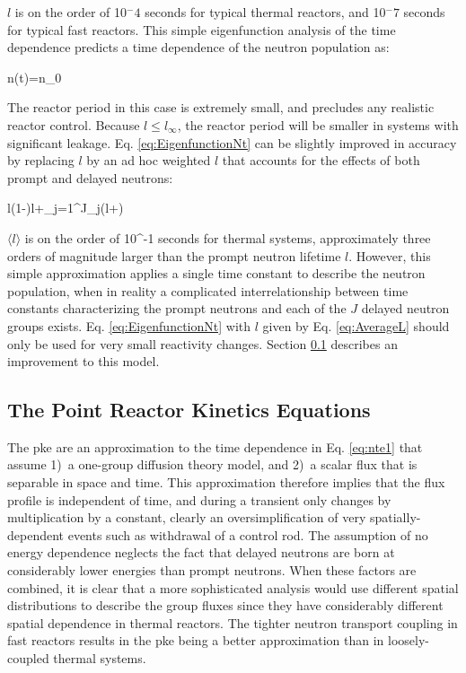 \(l\) is on the order of 10$^-4$ seconds for typical thermal reactors, and 10$^-7$ seconds for typical fast reactors. This simple eigenfunction analysis of the time dependence predicts a time dependence of the neutron population as:

\beq
\label{eq:EigenfunctionNt}
n(t)=n_0
\eeq

The reactor period in this case is extremely small, and precludes any realistic reactor control. Because \(l\leq l_\infty\), the reactor period will be smaller in systems with significant leakage. Eq. \eqref{eq:EigenfunctionNt} can be slightly improved in accuracy by replacing \(l\) by an ad hoc weighted \(l\) that accounts for the effects of both prompt and delayed neutrons:

\beq
\label{eq:AverageL}
\langle l\rangle\equiv(1-\beta)l+\sum_{j=1}^J\beta_j\left(l+\right)
\eeq

\(\langle l\rangle\) is on the order of 10^{-1} seconds for thermal systems, approximately three orders of magnitude larger than the prompt neutron lifetime \(l\). However, this simple approximation applies a single time constant to describe the neutron population, when in reality a complicated interrelationship between time constants characterizing the prompt neutrons and each of the \(J\) delayed neutron groups exists. Eq. \eqref{eq:EigenfunctionNt} with \(l\) given by Eq. \eqref{eq:AverageL} should only be used for very small reactivity changes. Section \ref{sec:PKE} describes an improvement to this model.

\subsection{The Point Reactor Kinetics Equations}
\label{sec:PKE}

The \gls{pke} are an approximation to the time dependence in Eq. \eqref{eq:nte1} that assume 1)~a one-group diffusion theory model, and 2)~a scalar flux that is separable in space and time. This approximation therefore implies that the flux profile is independent of time, and during a transient only changes by multiplication by a constant, clearly an oversimplification of very spatially-dependent events such as withdrawal of a control rod. The assumption of no energy dependence neglects the fact that delayed neutrons are born at considerably lower energies than prompt neutrons. When these factors are combined, it is clear that a more sophisticated analysis would use different spatial distributions to describe the group fluxes since they have considerably different spatial dependence in thermal reactors. The tighter neutron transport coupling in fast reactors results in the \gls{pke} being a better approximation than in loosely-coupled thermal systems.

